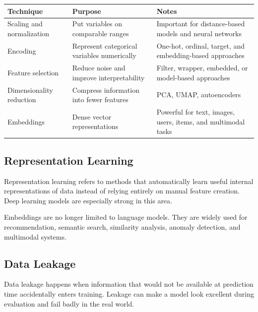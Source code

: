 \documentclass[11pt,a4paper]{article}
\begin{document}
\begin{longtable}{@{}p{3.2cm}p{4.0cm}p{5.8cm}@{}}
\toprule
\rowcolor{primary!15}
\textbf{Technique} & \textbf{Purpose} & \textbf{Notes} \\
\midrule
\endhead
Scaling and normalization & Put variables on comparable ranges & Important for distance-based models and neural networks \\
\addlinespace
Encoding & Represent categorical variables numerically & One-hot, ordinal, target, and embedding-based approaches \\
\addlinespace
Feature selection & Reduce noise and improve interpretability & Filter, wrapper, embedded, or model-based approaches \\
\addlinespace
Dimensionality reduction & Compress information into fewer features & PCA, UMAP, autoencoders \\
\addlinespace
Embeddings & Dense vector representations & Powerful for text, images, users, items, and multimodal tasks \\
\bottomrule
\end{longtable}

\subsection{Representation Learning}

\begin{definitionbox}
Representation learning refers to methods that automatically learn useful internal representations of data instead of relying entirely on manual feature creation. Deep learning models are especially strong in this area.
\end{definitionbox}

\begin{conceptbox}
Embeddings are no longer limited to language models. They are widely used for recommendation, semantic search, similarity analysis, anomaly detection, and multimodal systems.
\end{conceptbox}

\subsection{Data Leakage}

\begin{alertbox}
Data leakage happens when information that would not be available at prediction time accidentally enters training. Leakage can make a model look excellent during evaluation and fail badly in the real world.
\end{alertbox}
\end{document}
